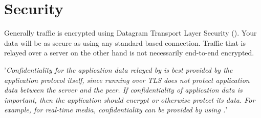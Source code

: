 \section{Security}
Generally  traffic is encrypted using Datagram Transport Layer Security (). Your data will be as secure as using any standard  based connection. Traffic that is relayed over a  server on the other hand is not necessarily end-to-end encrypted.

'\textit{Confidentiality for the application data relayed by  is best provided by the application protocol itself, since running  over TLS does not protect application data between the server and the peer. If confidentiality of application data is important, then the application should encrypt or otherwise protect its data. For example, for real-time media, confidentiality can be provided by using .}'~\autocite{TURN:sec}
